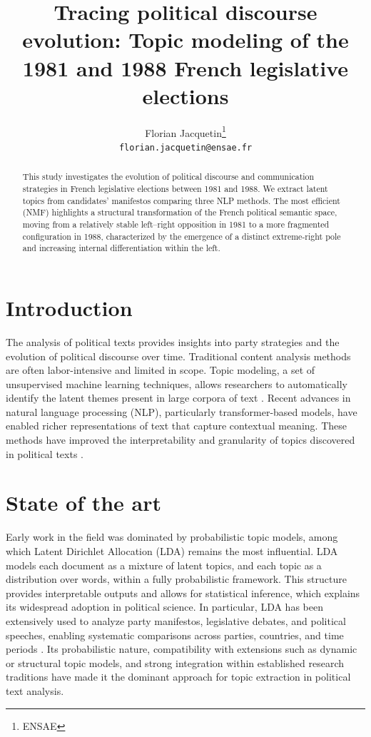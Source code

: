 \documentclass{article}
\title{Tracing political discourse evolution: Topic modeling of the 1981 and 1988 French legislative elections}
\author{%
  Florian Jacquetin\thanks{ENSAE}  \\
  \texttt{florian.jacquetin@ensae.fr}
}
\begin{document}
\maketitle


\begin{abstract}
This study investigates the evolution of political discourse and communication strategies in French legislative elections between 1981 and 1988. We extract latent topics from candidates' manifestos comparing three NLP methods. The most efficient (NMF) highlights a structural transformation of the French political semantic space, moving from a relatively stable left–right opposition in 1981 to a more fragmented configuration in 1988, characterized by the emergence of a distinct extreme-right pole and increasing internal differentiation within the left.
\end{abstract}


\section{Introduction}
The analysis of political texts provides insights into party strategies and the evolution of political discourse over time. Traditional content analysis methods are often labor-intensive and limited in scope. Topic modeling, a set of unsupervised machine learning techniques, allows researchers to automatically identify the latent themes present in large corpora of text \citep{blei2003latent}. Recent advances in natural language processing (NLP), particularly transformer-based models, have enabled richer representations of text that capture contextual meaning. These methods have improved the interpretability and granularity of topics discovered in political texts \citep{grootendorst2022bertopic}.

\section{State of the art}

Early work in the field was dominated by probabilistic topic models, among which Latent Dirichlet Allocation (LDA) \citep{blei2003latent} remains the most influential. LDA models each document as a mixture of latent topics, and each topic as a distribution over words, within a fully probabilistic framework. This structure provides interpretable outputs and allows for statistical inference, which explains its widespread adoption in political science. In particular, LDA has been extensively used to analyze party manifestos, legislative debates, and political speeches, enabling systematic comparisons across parties, countries, and time periods \citep{greene2016topic}. Its probabilistic nature, compatibility with extensions such as dynamic or structural topic models, and strong integration within established research traditions have made it the dominant approach for topic extraction in political text analysis.
\end{document}
